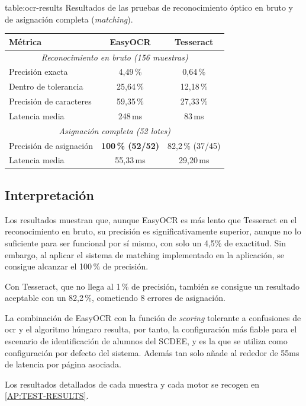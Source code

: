 \begin{table}[Resultados de las pruebas de calidad OCR]%
            {table:ocr-results}%
            {Resultados de las pruebas de reconocimiento óptico en bruto y
             de asignación completa (\textit{matching}).}
  \small
  \renewcommand{\arraystretch}{1.3}
  \begin{tabular}{l c c}
    \hline
    \textbf{Métrica} & \textbf{EasyOCR} & \textbf{Tesseract} \\
    \hline
    \multicolumn{3}{c}{\textit{Reconocimiento en bruto (156 muestras)}} \\
    \hline
    Precisión exacta          & 4{,}49\,\%  & 0{,}64\,\%  \\
    Dentro de tolerancia      & 25{,}64\,\% & 12{,}18\,\% \\
    Precisión de caracteres   & 59{,}35\,\% & 27{,}33\,\% \\
    Latencia media            & 248\,ms     & 83\,ms      \\
    \hline
    \multicolumn{3}{c}{\textit{Asignación completa (52 lotes)}} \\
    \hline
    Precisión de asignación   & \textbf{100\,\% (52/52)} & 82{,}2\,\% (37/45) \\
    Latencia media            & 55{,}33\,ms & 29{,}20\,ms \\
    \hline
  \end{tabular}
\end{table}

\subsection{Interpretación}

Los resultados muestran que, aunque EasyOCR es más lento que Tesseract
en el reconocimiento en bruto, su precisión es significativamente
superior, aunque no lo suficiente para ser funcional por sí mismo, con solo
un 4{,}5\% de exactitud. Sin embargo, al aplicar el sistema de matching
implementado en la aplicación, se consigue alcanzar el 100\,\% de precisión.

Con Tesseract, que no llega al 1\,\% de precisión, también se consigue un
resultado aceptable con un 82{,}2\,\%, cometiendo 8 errores
de asignación.

La combinación de EasyOCR con la función de \textit{scoring} tolerante a
confusiones de \acs{ocr} y el algoritmo húngaro resulta, por tanto, la
configuración más fiable para el escenario de identificación de alumnos
del SCDEE, y es la que se utiliza como configuración por defecto del
sistema. Además tan solo añade al rededor de 55ms de latencia por página
asociada.

Los resultados detallados de cada muestra y cada motor se recogen en
\cref{AP:TEST-RESULTS}.
